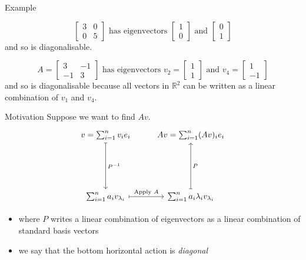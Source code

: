 \documentclass{beamer}
\begin{document}
\begin{frame}{Example}
\begin{example}
	\begin{equation*}
	\left[
	\begin{matrix}
	3&0\\
	0&5
	\end{matrix}
	\right]
	\text{ has eigenvectors }
	\left[
	\begin{matrix}
	1\\
	0
	\end{matrix}
	\right]\text{ and }
	\left[
	\begin{matrix}
	0\\
	1
	\end{matrix}
	\right]
	\end{equation*}
	and so is diagonalisable.
\end{example}
\begin{example}
	\begin{equation*}
		A = \left[\begin{matrix}
			3 & -1\\
			-1 & 3
		\end{matrix}\right]
	\text{ has eigenvectors }
	v_2 = \left[
	\begin{matrix}
	1\\
	1
	\end{matrix}
	\right]\text{ and }
	v_4 = \left[
	\begin{matrix}
	1\\
	-1
	\end{matrix}
	\right]
	\end{equation*}
	and so is diagonalisable because all vectors in $\mathbb{R}^2$ can be written as a linear combination of $v_1$ and $v_4$.
\end{example}
\end{frame}

\begin{frame}[fragile]{Motivation}
Suppose we want to find $Av$.
{\LARGE
\begin{equation*}
\begin{tikzcd}[row sep = 2cm]
v = \sum_{i=1}^n v_i e_i \dar[mapsto]{P^{-1}} & Av = \sum_{i=1}^n (Av)_i e_i\\
\sum_{i=1}^n a_i v_{\lambda_i} \rar[mapsto]{\text{Apply }A} & \sum_{i=1}^n a_i\lambda_i v_{\lambda_i} \uar[mapsto][swap]{P}
\end{tikzcd}
\end{equation*}
}
\begin{itemize}
	\item where $P$ writes a linear combination of eigenvectors as a linear combination of standard basis vectors
	\item we say that the bottom horizontal action is \emph{diagonal}
\end{itemize}
\end{frame}
\end{document}
